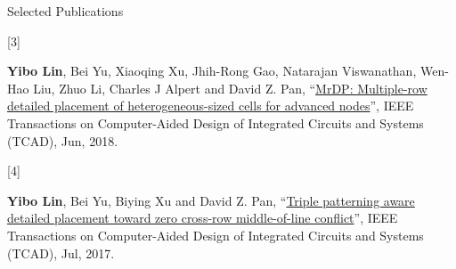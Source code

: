 \begin{rSection}{Selected Publications}
%    
%            
%
%    
%            
%
%    
%            
%
\item[{[3]}]{
        \textbf{Yibo Lin}, Bei Yu, Xiaoqing Xu, Jhih-Rong Gao, Natarajan Viswanathan, Wen-Hao Liu, Zhuo Li, Charles J Alpert and David Z. Pan, 
    ``\href{https://doi.org/10.1109/TCAD.2017.2748025}{MrDP: Multiple-row detailed placement of heterogeneous-sized cells for advanced nodes}'', 
    IEEE Transactions on Computer-Aided Design of Integrated Circuits and Systems (TCAD), Jun, 2018.
    
}
%            
%
%    
%            
%
%    
            

\item[{[4]}]{
        \textbf{Yibo Lin}, Bei Yu, Biying Xu and David Z. Pan, 
    ``\href{http://dx.doi.org/10.1109/TCAD.2017.2648843}{Triple patterning aware detailed placement toward zero cross-row middle-of-line conflict}'', 
    IEEE Transactions on Computer-Aided Design of Integrated Circuits and Systems (TCAD), Jul, 2017.
    
}
\end{rSection}
